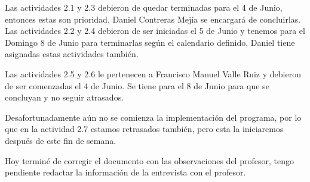 \documentclass[letterpaper]{article}
\begin{document}
Las actividades 2.1 y 2.3 debieron de quedar terminadas para el 4 de Junio, entonces estas son prioridad, Daniel Contreras Mejía se encargará de concluirlas. Las actividades 2.2 y 2.4 debieron de ser iniciadas el 5 de Junio y tenemos para el Domingo 8 de Junio para terminarlas según el calendario definido, Daniel tiene asignadas estas actividades también.

Las actividades 2.5 y 2.6 le pertenecen a Francisco Manuel Valle Ruiz y debieron de ser comenzadas el 4 de Junio. Se tiene para el 8 de Junio para que se concluyan y no seguir atrasados.

Desafortunadamente aún no se comienza la implementación del programa, por lo que en la actividad 2.7 estamos retrasados también, pero esta la iniciaremos después de este fin de semana.

Hoy terminé de corregir el documento con las observaciones del profesor, tengo pendiente redactar la información de la entrevista con el profesor.
\end{document}
